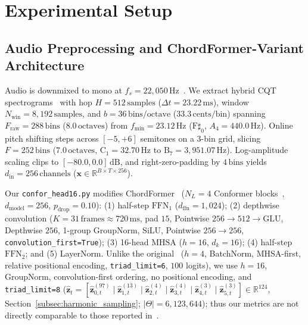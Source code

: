 \documentclass{article}
\begin{document}
\section{Experimental Setup}\label{sec:experiments}

\subsection{Audio Preprocessing and ChordFormer-Variant Architecture}\label{subsec:preprocessing_arch}

Audio is downmixed to mono at $f_s = 22{,}050\,\text{Hz}$~\cite{akram2026chordformer}. We extract hybrid CQT spectrograms~\cite{brown1991calculation} with hop $H = 512\,\text{samples}$ ($\Delta t = 23.22\,\text{ms}$), window $N_{\text{win}} = 8{,}192\,\text{samples}$, and $b = 36\,\text{bins/octave}$ ($33.3\,\text{cents/bin}$) spanning $F_{\text{raw}} = 288\,\text{bins}$ ($8.0\,\text{octaves}$) from $f_{\min} = 23.12\,\text{Hz}$ ($\text{F}\sharp_0$, $A_4 = 440.0\,\text{Hz}$). Online pitch shifting steps across $[-5, +6]$ semitones on a $3$-bin grid, slicing $F = 252\,\text{bins}$ ($7.0\,\text{octaves}$, $\text{C}_1 = 32.70\,\text{Hz}$ to $\text{B}_7 = 3{,}951.07\,\text{Hz}$). Log-amplitude scaling clips to $[-80.0, 0.0]\,\text{dB}$, and right-zero-padding by $4\,\text{bins}$ yields $d_{\text{in}} = 256\,\text{channels}$ ($\mathbf{x} \in \mathbb{R}^{B \times T \times 256}$).

Our {\small\texttt{confor\_head16.py}} modifies ChordFormer~\cite{akram2026chordformer} ($N_L = 4$ Conformer blocks~\cite{gulati2020conformer}, $d_{\text{model}} = 256$, $p_{\text{drop}} = 0.10$): (1) half-step $\text{FFN}_1$ ($d_{\text{ffn}} = 1{,}024$); (2) depthwise convolution ($K = 31\,\text{frames} \approx 720\,\text{ms}$, pad $15$, Pointwise $256 \!\to\! 512 \!\to\! \text{GLU}$, Depthwise $256$, 1-group GroupNorm, SiLU, Pointwise $256 \!\to\! 256$, {\small\texttt{convolution\_first=True}}); (3) 16-head $\text{MHSA}$ ($h = 16$, $d_k = 16$); (4) half-step $\text{FFN}_2$; and (5) LayerNorm. Unlike the original~\cite{akram2026chordformer} ($h = 4$, BatchNorm, MHSA-first, relative positional encoding, {\small\texttt{triad\_limit=6}}, $100$ logits), we use $h = 16$, GroupNorm, convolution-first ordering, no positional encoding, and {\small\texttt{triad\_limit=8}} ($\hat{\mathbf{z}}_t = [\hat{\mathbf{z}}_{0,t}^{(97)} \mid \hat{\mathbf{z}}_{1,t}^{(13)} \mid \hat{\mathbf{z}}_{2,t}^{(4)} \mid \hat{\mathbf{z}}_{3,t}^{(4)} \mid \hat{\mathbf{z}}_{4,t}^{(3)} \mid \hat{\mathbf{z}}_{5,t}^{(3)}] \in \mathbb{R}^{124}$, Section~\ref{subsec:harmonic_sampling}; $|\Theta| = 6{,}123{,}644$); thus our metrics are not directly comparable to those reported in~\cite{akram2026chordformer}.
\end{document}

